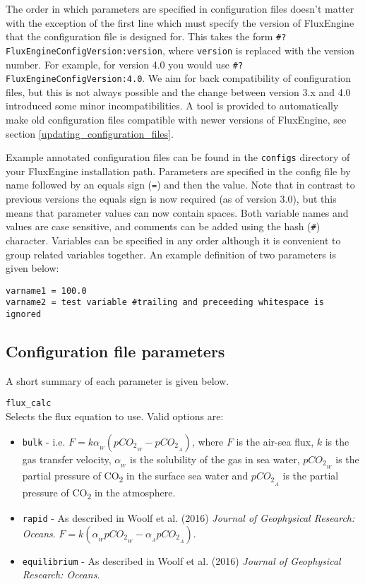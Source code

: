 \documentclass[]{scrartcl}
\newcommand{\conflistingsep}{\vspace{0.40cm}}
\begin{document}
The order in which parameters are specified in configuration files doesn't matter with the exception of the first line which must specify the version of FluxEngine that the configuration file is designed for. This takes the form \texttt{\#?FluxEngineConfigVersion:version}, where \texttt{version} is replaced with the version number. For example, for version 4.0 you would use \texttt{\#?FluxEngineConfigVersion:4.0}. We aim for back compatibility of configuration files, but this is not always possible and the change between version 3.x and 4.0 introduced some minor incompatibilities. A tool is provided to automatically make old configuration files compatible with newer versions of FluxEngine, see section \ref{updating_configuration_files}.

Example annotated configuration files can be found in the \texttt{configs} directory of your FluxEngine installation path. Parameters are specified in the config file by name followed by an equals sign (\texttt{=}) and then the value. Note that in contrast to previous versions the equals sign is now required (as of version 3.0), but this means that parameter values can now contain spaces. Both variable names and values are case sensitive, and comments can be added using the hash (\texttt{\#}) character. Variables can be specified in any order although it is convenient to group related variables together. An example definition of two parameters is given below:
\begin{lstlisting}
varname1 = 100.0
varname2 = test variable #trailing and preceeding whitespace is ignored
\end{lstlisting}

\subsection{Configuration file parameters}
A short summary of each parameter is given below.

\conflistingsep \noindent
\texttt{flux\_calc}\\
Selects the flux equation to use. Valid options are:
\begin{itemize}
	\item \texttt{bulk} - i.e. $F = k\alpha_{_W} ({pCO_2}_{_W} - {pCO_2}_{_A})$, where $F$ is the air-sea flux, $k$ is the gas transfer velocity, $\alpha_{_W}$ is the solubility of the gas in sea water, ${pCO_2}_{_W}$ is the partial pressure of CO\textsubscript{2} in the surface sea water and ${pCO_2}_{_A}$ is the partial pressure of CO\textsubscript{2} in the atmosphere.
	\item \texttt{rapid} - As described in Woolf et al. (2016) \textit{Journal of Geophysical Research: Oceans}. $F = k(\alpha_{_W}{pCO_2}_{_W} - \alpha_{_A}{pCO_2}_{_A})$.
	\item \texttt{equilibrium} - As described in Woolf et al. (2016) \textit{Journal of Geophysical Research: Oceans}.
\end{itemize} %
\end{document}
